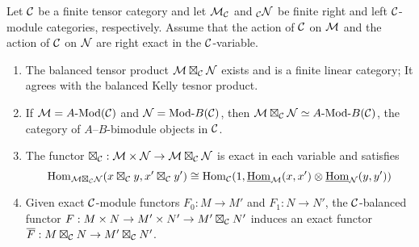 \documentclass{amsart}
\begin{document}
\begin{theorem} \label{thm:DelignePrdtOverATCExists}
	Let $\mathcal C$ be a finite tensor category and let $\mathcal M_{\mathcal C}$ and ${}_{\mathcal C}\mathcal N$ be finite right and left $\mathcal C$-module categories, respectively. Assume that the action of $\mathcal C$ on $\mathcal M$ and the action of $\mathcal C$ on $\mathcal N$ are right exact in the $\mathcal C$-variable.
	\begin{enumerate}
		\item The balanced tensor product $\mathcal M \boxtimes_{\mathcal C} \mathcal N$ exists and is a finite linear category; It agrees with the balanced Kelly tesnor product. 

		\item If $\cM = \Mod{A}{}(\cC)$ and $\cN = \Mod{}{B}(\cC)$, then $\cM \boxtimes_{\cC} \cN \simeq \Mod{A }{B}(\cC)$, the category of $A$--$B$-bimodule objects in $\mathcal C$.
		\item The functor $\boxtimes_{\mathcal C}: \mathcal M \times \mathcal N \to \mathcal M \boxtimes_{\mathcal C} \mathcal N$ is exact in each variable and satisfies 
		\begin{equation*}
			 \operatorname{Hom}_{\mathcal M \boxtimes_{\mathcal C} \mathcal N} (x \boxtimes_{\mathcal C} y, x' \boxtimes_{\mathcal C} y') \cong \operatorname{Hom}_{\mathcal C}(1, \operatorname{\underline{Hom}}_{\mathcal M}(x,x') \otimes \operatorname{\underline{Hom}}_{\mathcal N}(y, y'))
		\end{equation*}
		\item Given exact $\mathcal C$-module functors $F_0: M \to M'$ and $F_1: N \to N'$, the $\mathcal C$-balanced functor $F: M \times N \to M' \times N' \to M' \boxtimes_{\mathcal C} N'$ induces an exact functor $\overline{F}: M \boxtimes_{\mathcal C} N \to M' \boxtimes_{\mathcal C} N'$.
	\end{enumerate} 
\end{theorem}
\end{document}
